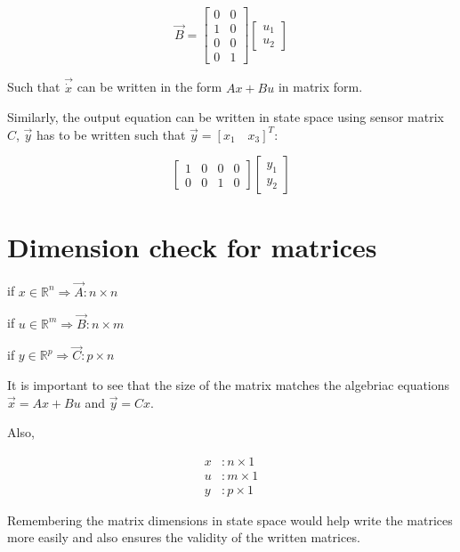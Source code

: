 \begin{equation*}
	\vec{B} = \begin{bmatrix}
		0 &0 \\
		1 &0 \\
		0 &0 \\
		0 &1	
	\end{bmatrix} \begin{bmatrix}
	u_1 \\ u_2
	\end{bmatrix}
\end{equation*}

Such that $\vec{\dot{x}}$ can be written in the form $Ax + Bu$ in matrix form.

Similarly, the output equation can be written in state space using sensor matrix $C$, $\vec{y}$ has to be written such that $\vec{y} = [x_1 \quad x_3]^{T}$:

\begin{equation*}
		\begin{bmatrix}
			1 &0 &0 &0 \\
			0 &0 &1 &0
		\end{bmatrix} \begin{bmatrix}
			y_1 \\ y_2
		\end{bmatrix}
\end{equation*}

\section{Dimension check for matrices \cite[p.3.1.6]{CMR_Lec_ppt_3}}

if $x \in \mathbb{R}^{n} \Longrightarrow \vec{A} : n \times n$

if $u \in \mathbb{R}^{m} \Longrightarrow \vec{B} : n \times m$

if $y \in \mathbb{R}^{p} \Longrightarrow \vec{C} : p \times n$

It is important to see that the size of the matrix matches the algebriac equations $\vec{x} = Ax + Bu$ and $\vec{y} = Cx$.

Also,

\begin{align*}
	x &: n \times 1 \\
	u &: m \times 1 \\
	y &: p \times 1
\end{align*}

Remembering the matrix dimensions in state space would help write the matrices more easily and also ensures the validity of the written matrices.

